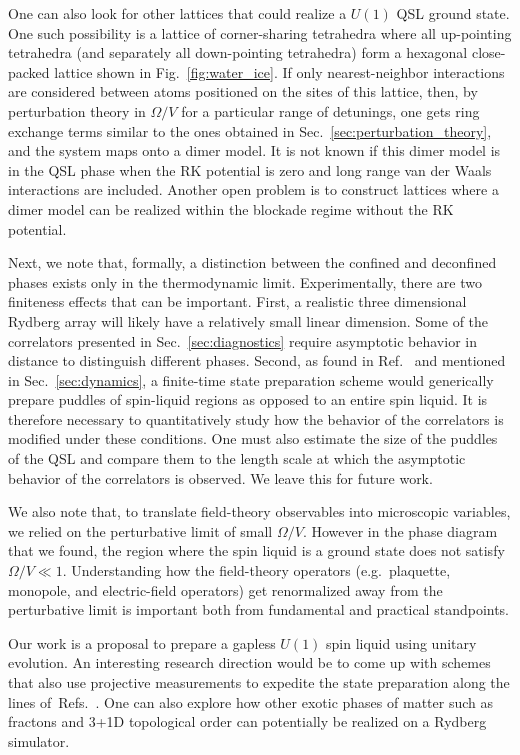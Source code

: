 \documentclass[twocolumn,superscriptaddress,amsmath,amssymb,aps,prx,nofootinbib]{revtex4-2}
\begin{document}
One can also look for other lattices that could realize a $U(1)$ QSL ground state. One such possibility is a lattice of corner-sharing tetrahedra where all up-pointing tetrahedra (and separately all down-pointing tetrahedra) form a hexagonal close-packed lattice shown in Fig.~\ref{fig:water_ice}. If only nearest-neighbor interactions are considered between atoms positioned on the sites of this lattice, then, by perturbation theory in $\Omega/V$ for a particular range of detunings, one gets ring exchange terms similar to the ones obtained in Sec.~\ref{sec:perturbation_theory}, and the system maps onto a dimer model. It is not known if this dimer model is in the QSL phase when the RK potential is zero and long range van der Waals interactions are included. Another open problem is to construct lattices where a dimer model can be realized within the blockade regime without the RK potential.

Next, we note that, formally, a distinction between the confined and deconfined phases exists only in the thermodynamic limit. Experimentally, there are two finiteness effects that can be important. First, a realistic three dimensional Rydberg array will likely have a relatively small linear dimension.  
Some of the correlators presented in Sec.~\ref{sec:diagnostics} require asymptotic behavior in distance to distinguish different phases. Second, as found in Ref.~\cite{sahay2022quantum} and mentioned in Sec.~\ref{sec:dynamics}, a finite-time state preparation scheme would generically prepare puddles of spin-liquid regions as opposed to an entire spin liquid. It is therefore necessary to quantitatively study how the behavior of the correlators is modified under these conditions. One must also estimate the size of the puddles of the QSL and compare them to the length scale at which the asymptotic behavior of the correlators is observed. We leave this for future work.

We also note that, to translate field-theory observables into microscopic variables, we relied on the perturbative limit of small $\Omega/V$. However in the phase diagram that we found, the region where the spin liquid is a ground state does not satisfy $\Omega/V\ll1$. Understanding how the field-theory operators (e.g.~plaquette, monopole, and electric-field operators) get renormalized away from the perturbative limit is important both from fundamental and practical standpoints.

Our work is a proposal to prepare a gapless $U(1)$ spin liquid using unitary evolution. An interesting research direction would be to come up with schemes that also use projective measurements to expedite the state preparation along the lines of~Refs.~\cite{tantivasadakarn2022shortest,lavasani2023monitored}. One can also explore how other exotic phases of matter such as fractons and 3+1D topological order can potentially be realized on a Rydberg simulator.
\end{document}
